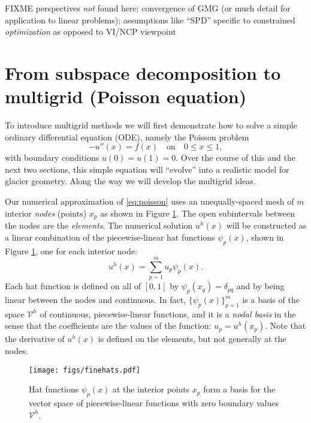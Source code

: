 \documentclass[letterpaper,final,12pt,reqno]{amsart}
\begin{document}
FIXME perspectives \emph{not} found here: convergence of GMG (or much detail for application to linear problems); assumptions like ``SPD'' specific to constrained \emph{optimization} as opposed to VI/NCP viewpoint


\section{From subspace decomposition to multigrid (Poisson equation)} \label{sec:subspace}

To introduce multigrid methods we will first demonstrate how to solve a simple ordinary differential equation (ODE), namely the Poisson problem
\begin{equation}
- u''(x) = f(x) \quad \text{on} \quad 0 \le x \le 1, \label{eq:poisson}
\end{equation}
with boundary conditions $u(0)=u(1)=0$.  Over the course of this and the next two sections, this simple equation will ``evolve'' into a realistic model for glacier geometry.  Along the way we will develop the multigrid ideas.

Our numerical approximation of \eqref{eq:poisson} uses an unequally-spaced mesh of $m$ interior \emph{nodes} (points) $x_p$ as shown in Figure \ref{fig:finehats}.  The open subintervals between the nodes are the \emph{elements}.  The numerical solution $u^h(x)$ will be constructed as a linear combination of the piecewise-linear hat functions $\psi_p(x)$, shown in Figure \ref{fig:finehats}, one for each interior node:
\begin{equation}
u^h(x) = \sum_{p=1}^m u_p \psi_p(x). \label{eq:trialsolution}
\end{equation}
Each hat function is defined on all of $[0,1]$ by $\psi_p(x_q) = \delta_{pq}$ and by being linear between the nodes and continuous.  In fact, $\{\psi_p(x)\}_{p=1}^m$ is a basis of the space $\mathcal{V}^h$ of continuous, piecewise-linear functions, and it is a \emph{nodal basis} in the sense that the coefficients are the values of the function: $u_p=u^h(x_p)$.  Note that the derivative of $u^h(x)$ is defined on the elements, but not generally at the nodes.

\begin{figure}
\texttt{[image: figs/finehats.pdf]}
\caption{Hat functions $\psi_p(x)$ at the interior points $x_p$ form a basis for the vector space of piecewise-linear functions  with zero boundary values $\mathcal{V}^h$.}
\label{fig:finehats}
\end{figure}
\end{document}
